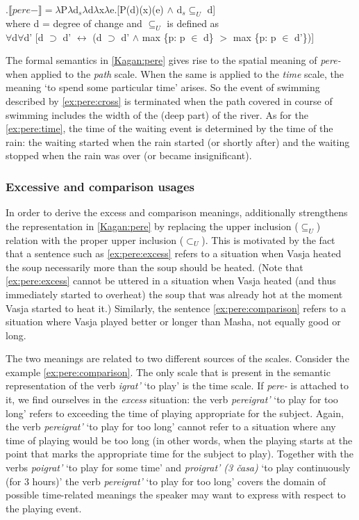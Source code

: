 \ex.\label{Kagan:pere}$\llbracket pere- \rrbracket = \lambda$P$\lambda$d$_s\lambda$d$\lambda$x$\lambda$e.[P(d)(x)(e) $\wedge$ d$_s \subseteq _U$ d]\\
where d = degree of change \citep{KennedyLevin:02} and $\subseteq _U$ is defined as\\
$\forall$d$\forall$d' [d $\supset$ d' $\leftrightarrow$ (d $\supset$ d' $\wedge$ max \{p: p $\in$ d\} $>$ max \{p: p $\in$ d'\})]\\

The formal semantics in \ref{Kagan:pere} gives rise to the spatial meaning of \textit{pere-} when applied to the \textit{path} scale. When the same is applied to the \textit{time} scale, the meaning `to spend some particular time' arises. So the event of swimming described by \ref{ex:pere:cross} is terminated when the path covered in course of swimming includes the width of the (deep part) of the river. As for the \ref{ex:pere:time}, the time of the waiting event is determined by the time of the rain: the waiting started when the rain started (or shortly after) and the waiting stopped when the rain was over (or became insignificant).

\subsubsection{Excessive and comparison usages}
In order to derive the excess and comparison meanings, \citet[133]{Kagan:book} additionally strengthens the representation in \ref{Kagan:pere} by replacing the upper inclusion ($\subseteq _U$) relation with the proper upper inclusion ($\subset _U$). This is motivated by the fact that a sentence such as \ref{ex:pere:excess} refers to a situation when Vasja heated the soup necessarily more than the soup should be heated. (Note that \ref{ex:pere:excess} cannot be uttered in a situation when Vasja heated (and thus immediately started to overheat) the soup that was already hot at the moment Vasja started to heat it.) Similarly, the sentence \ref{ex:pere:comparison} refers to a situation where Vasja played better or longer than Masha, not equally good or long.

The two meanings are related to two different sources of the scales. Consider the example \ref{ex:pere:comparison}. The only scale that is present in the semantic representation of the verb \textit{igrat'} `to play' is the time scale. If \textit{pere-} is attached to it, we find ourselves in the \textit{excess} situation: the verb \textit{pereigrat'} `to play for too long' refers to exceeding the time of playing appropriate for the subject. Again, the verb \textit{pereigrat'} `to play for too long' cannot refer to a situation where any time of playing would be too long (in other words, when the playing starts at the point that marks the appropriate time for the subject to play). Together with the verbs \textit{poigrat'} `to play for some time' and \textit{proigrat' (3 \v{c}asa)} `to play continuously (for 3 hours)' the verb \textit{pereigrat'} `to play for too long' covers the domain of possible time-related meanings the speaker may want to express with respect to the playing event.

